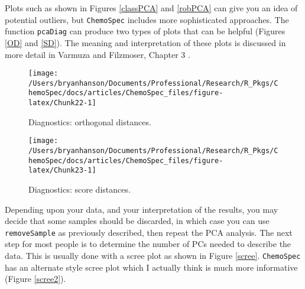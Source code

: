 \documentclass[letter,10pt,twocolumn,twoside,printwatermark=false]{pinp}
\begin{document}
Plots such as shown in Figures \ref{classPCA} and \ref{robPCA} can give
you an idea of potential outliers, but \texttt{ChemoSpec} includes more
sophisticated approaches. The function \texttt{pcaDiag} can produce two
types of plots that can be helpful (Figures \ref{OD} and \ref{SD}). The
meaning and interpretation of these plots is discussed in more detail in
Varmuza and Filzmoser, Chapter 3 \citep{Filzmoser2009}.

\begin{Shaded}
\begin{Highlighting}[]
\StringTok{ }
   \NormalTok{,}
   \NormalTok{)}
\end{Highlighting}
\end{Shaded}

\begin{figure}

{\centering \texttt{[image: /Users/bryanhanson/Documents/Professional/Research/R\_Pkgs/ChemoSpec/docs/articles/ChemoSpec\_files/figure-latex/Chunk22-1]} 

}

\caption{\label{OD}Diagnostics: orthogonal distances.}\label{fig:Chunk22}
\end{figure}

\begin{Shaded}
\begin{Highlighting}[]
\StringTok{ }
   \NormalTok{,}
   \NormalTok{)}
\end{Highlighting}
\end{Shaded}

\begin{figure}

{\centering \texttt{[image: /Users/bryanhanson/Documents/Professional/Research/R\_Pkgs/ChemoSpec/docs/articles/ChemoSpec\_files/figure-latex/Chunk23-1]} 

}

\caption{\label{SD}Diagnostics: score distances.}\label{fig:Chunk23}
\end{figure}

Depending upon your data, and your interpretation of the results, you
may decide that some samples should be discarded, in which case you can
use \texttt{removeSample} as previously described, then repeat the PCA
analysis. The next step for most people is to determine the number of
PCs needed to describe the data. This is usually done with a scree plot
as shown in Figure \ref{scree}. \texttt{ChemoSpec} has an alternate
style scree plot which I actually think is much more informative (Figure
\ref{scree2}).
\end{document}
